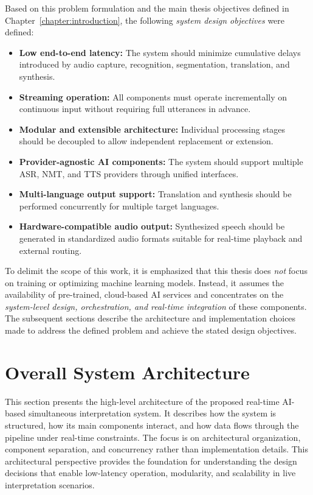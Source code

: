 Based on this problem formulation and the main thesis objectives defined in Chapter~\ref{chapter:introduction}, the following \emph{system design objectives} were defined:

\begin{itemize}
    \item \textbf{Low end-to-end latency:} The system should minimize cumulative delays introduced by audio capture, recognition, segmentation, translation, and synthesis.
    \item \textbf{Streaming operation:} All components must operate incrementally on continuous input without requiring full utterances in advance.
    \item \textbf{Modular and extensible architecture:} Individual processing stages should be decoupled to allow independent replacement or extension.
    \item \textbf{Provider-agnostic AI components:} The system should support multiple ASR, NMT, and TTS providers through unified interfaces.
    \item \textbf{Multi-language output support:} Translation and synthesis should be performed concurrently for multiple target languages.
    \item \textbf{Hardware-compatible audio output:} Synthesized speech should be generated in standardized audio formats suitable for real-time playback and external routing.
\end{itemize}

To delimit the scope of this work, it is emphasized that this thesis does \emph{not} focus on training or optimizing machine learning models. Instead, it assumes the availability of pre-trained, cloud-based AI services and concentrates on the \emph{system-level design, orchestration, and real-time integration} of these components. The subsequent sections describe the architecture and implementation choices made to address the defined problem and achieve the stated design objectives.


\section{Overall System Architecture}
\label{sec:architecture}

This section presents the high-level architecture of the proposed real-time AI-based simultaneous interpretation system. It describes how the system is structured, how its main components interact, and how data flows through the pipeline under real-time constraints. The focus is on architectural organization, component separation, and concurrency rather than implementation details. This architectural perspective provides the foundation for understanding the design decisions that enable low-latency operation, modularity, and scalability in live interpretation scenarios.

